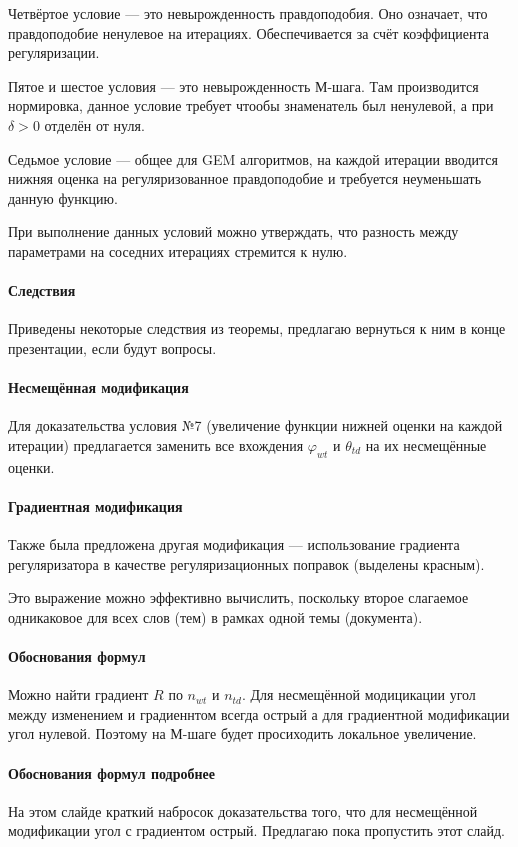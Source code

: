 \documentclass[12pt]{article}
\renewcommand{\phi}{\varphi}
\begin{document}
Четвёртое условие --- это невырожденность правдоподобия. Оно означает, что правдоподобие ненулевое на итерациях. Обеспечивается за счёт коэффициента регуляризации.

Пятое и шестое условия --- это невырожденность М-шага. Там производится нормировка, данное условие требует чтообы знаменатель был ненулевой, а при $\delta > 0$ отделён от нуля.

Седьмое условие --- общее для GEM алгоритмов, на каждой итерации вводится нижняя оценка на регуляризованное правдоподобие и требуется неуменьшать данную функцию.

При выполнение данных условий можно утверждать, что разность между параметрами на соседних итерациях стремится к нулю.

\paragraph{Следствия}
Приведены некоторые следствия из теоремы, предлагаю вернуться к ним в конце презентации, если будут вопросы.

\paragraph{Несмещённая модификация}
Для доказательства условия №7 (увеличение функции нижней оценки на каждой итерации) предлагается заменить все вхождения  $\phi_{wt}$ и $\theta_{td}$ на их несмещённые оценки.

\paragraph{Градиентная модификация}
Также была предложена другая модификация --- использование градиента регуляризатора в качестве регуляризационных поправок (выделены красным).

Это выражение можно эффективно вычислить, поскольку второе слагаемое одникаковое для всех слов (тем) в рамках одной темы (документа).

\paragraph{Обоснования формул}
Можно найти градиент $R$ по $n_{wt}$ и $n_{td}$. Для несмещённой модицикации угол между изменением и градиеннтом всегда острый а для градиентной модификации угол нулевой. Поэтому на М-шаге будет просиходить локальное увеличение.


\paragraph{Обоснования формул подробнее}
На этом слайде краткий набросок доказательства того, что для несмещённой модификации угол с градиентом острый. Предлагаю пока пропустить этот слайд.
\end{document}
